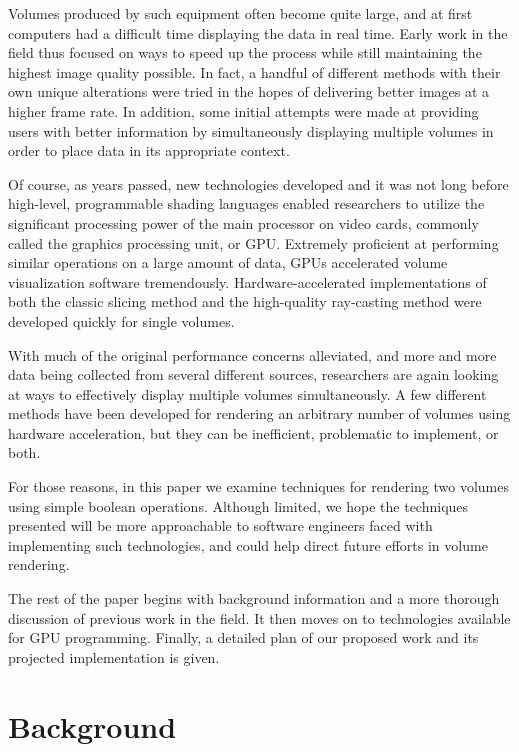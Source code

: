 \documentclass{report}
\begin{document}
Volumes produced by such equipment often become quite large, and at first
computers had a difficult time displaying the data in real time.  Early work in
the field thus focused on ways to speed up the process while still maintaining
the highest image quality possible.  In fact, a handful of different methods
with their own unique alterations were tried in the hopes of delivering better
images at a higher frame rate.  In addition, some initial attempts were made at
providing users with better information by simultaneously displaying multiple
volumes in order to place data in its appropriate context.

Of course, as years passed, new technologies developed and it was not long
before high-level, programmable shading languages enabled researchers to utilize
the significant processing power of the main processor on video cards, commonly
called the graphics processing unit, or GPU.  Extremely proficient at performing
similar operations on a large amount of data, GPUs accelerated volume
visualization software tremendously.  Hardware-accelerated implementations of
both the classic slicing method and the high-quality ray-casting method were
developed quickly for single volumes.

With much of the original performance concerns alleviated, and more and more
data being collected from several different sources, researchers are again
looking at ways to effectively display multiple volumes simultaneously.  A few
different methods have been developed for rendering an arbitrary number of
volumes using hardware acceleration, but they can be inefficient, problematic to
implement, or both.

For those reasons, in this paper we examine techniques for rendering two volumes
using simple boolean operations.  Although limited, we hope the techniques
presented will be more approachable to software engineers faced with
implementing such technologies, and could help direct future efforts in volume
rendering.

The rest of the paper begins with background information and a more thorough
discussion of previous work in the field.  It then moves on to technologies
available for GPU programming.  Finally, a detailed plan of our proposed work
and its projected implementation is given.

\chapter{Background}
\end{document}
